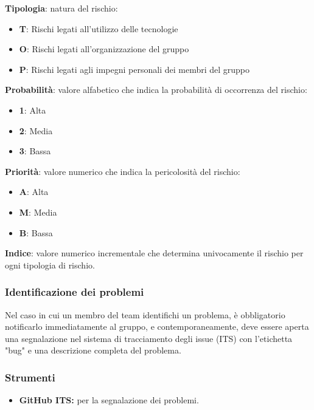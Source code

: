 \begin{flushleft}
    \textbf{Tipologia}: natura del rischio:
    \begin{itemize}
        \item \textbf{T}: Rischi legati all'utilizzo delle tecnologie
        \item \textbf{O}: Rischi legati all'organizzazione del gruppo
        \item \textbf{P}: Rischi legati agli impegni personali dei membri del gruppo
    \end{itemize}
    \textbf{Probabilità}: valore alfabetico che indica la probabilità di occorrenza del rischio:
    \begin{itemize}
        \item \textbf{1}: Alta
        \item \textbf{2}: Media
        \item \textbf{3}: Bassa
    \end{itemize}
    \textbf{Priorità}: valore numerico che indica la pericolosità del rischio:
    \begin{itemize}
        \item \textbf{A}: Alta
        \item \textbf{M}: Media
        \item \textbf{B}: Bassa
    \end{itemize}
    \textbf{Indice}: valore numerico incrementale che determina univocamente il rischio per ogni tipologia di rischio. 
\end{flushleft}
\subsubsection{Identificazione dei problemi}
Nel caso in cui un membro del team identifichi un problema, è obbligatorio notificarlo immediatamente al gruppo, e contemporaneamente, deve essere aperta una segnalazione nel sistema di tracciamento degli issue (ITS) con l'etichetta "bug" e una descrizione completa del problema.

\subsubsection{Strumenti}
\begin{itemize}
    \item \textbf{GitHub ITS:} 
        per la segnalazione dei problemi.
\end{itemize}